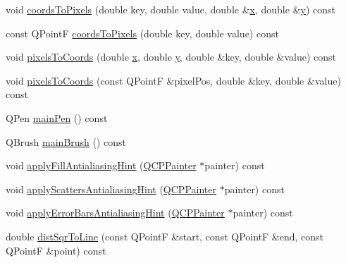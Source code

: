 \begin{DoxyCompactItemize}
\item 
void \hyperlink{class_q_c_p_abstract_plottable_ade710a776104b14c1c835168ce1bfc5c}{coords\+To\+Pixels} (double key, double value, double \&\hyperlink{_v_s_a___u_t_2_comparision_pictures_2_createtest_image_8m_a9336ebf25087d91c818ee6e9ec29f8c1}{x}, double \&\hyperlink{_v_s_a___u_t_2_comparision_pictures_2_createtest_image_8m_a2fb1c5cf58867b5bbc9a1b145a86f3a0}{y}) const 
\item 
const Q\+Point\+F \hyperlink{class_q_c_p_abstract_plottable_a9fd1c9df8391781f05b0be22fbe91e13}{coords\+To\+Pixels} (double key, double value) const 
\item 
void \hyperlink{class_q_c_p_abstract_plottable_a10408828446e9e0681c46d65120f382e}{pixels\+To\+Coords} (double \hyperlink{_v_s_a___u_t_2_comparision_pictures_2_createtest_image_8m_a9336ebf25087d91c818ee6e9ec29f8c1}{x}, double \hyperlink{_v_s_a___u_t_2_comparision_pictures_2_createtest_image_8m_a2fb1c5cf58867b5bbc9a1b145a86f3a0}{y}, double \&key, double \&value) const 
\item 
void \hyperlink{class_q_c_p_abstract_plottable_a3e2c361cfcdfd5d803ada4d333a07e15}{pixels\+To\+Coords} (const Q\+Point\+F \&pixel\+Pos, double \&key, double \&value) const 
\item 
Q\+Pen \hyperlink{class_q_c_p_abstract_plottable_a19276ed2382a3a06464417b8788b1451}{main\+Pen} () const 
\item 
Q\+Brush \hyperlink{class_q_c_p_abstract_plottable_ae74c123832da180c17e22203e748d9b7}{main\+Brush} () const 
\item 
void \hyperlink{class_q_c_p_abstract_plottable_ac08a480155895e674dbfe5a5670e0ff3}{apply\+Fill\+Antialiasing\+Hint} (\hyperlink{class_q_c_p_painter}{Q\+C\+P\+Painter} $\ast$painter) const 
\item 
void \hyperlink{class_q_c_p_abstract_plottable_a753272ee225a62827e90c3e1e78de4b1}{apply\+Scatters\+Antialiasing\+Hint} (\hyperlink{class_q_c_p_painter}{Q\+C\+P\+Painter} $\ast$painter) const 
\item 
void \hyperlink{class_q_c_p_abstract_plottable_af687bfe6160255960558eb71f1f81e73}{apply\+Error\+Bars\+Antialiasing\+Hint} (\hyperlink{class_q_c_p_painter}{Q\+C\+P\+Painter} $\ast$painter) const 
\item 
double \hyperlink{class_q_c_p_abstract_plottable_a5ea1cab44ca912dcdc96ed81ec5bed5d}{dist\+Sqr\+To\+Line} (const Q\+Point\+F \&start, const Q\+Point\+F \&end, const Q\+Point\+F \&point) const 
\end{DoxyCompactItemize}
